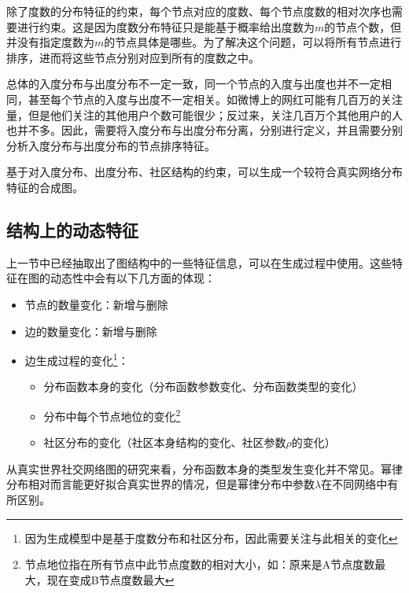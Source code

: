 除了度数的分布特征的约束，每个节点对应的度数、每个节点度数的相对次序也需要进行约束。这是因为度数分布特征只是能基于概率给出度数为$m$的节点个数，但并没有指定度数为$m$的节点具体是哪些。为了解决这个问题，可以将所有节点进行排序，进而将这些节点分别对应到所有的度数之中。

总体的入度分布与出度分布不一定一致，同一个节点的入度与出度也并不一定相同，甚至每个节点的入度与出度不一定相关。如微博上的网红可能有几百万的关注量，但是他们关注的其他用户个数可能很少；反过来，关注几百万个其他用户的人也并不多。因此，需要将入度分布与出度分布分离，分别进行定义，并且需要分别分析入度分布与出度分布的节点排序特征。

基于对入度分布、出度分布、社区结构的约束，可以生成一个较符合真实网络分布特征的合成图。

\subsection{结构上的动态特征}

上一节中已经抽取出了图结构中的一些特征信息，可以在生成过程中使用。这些特征在图的动态性中会有以下几方面的体现：

\begin{itemize}
    \item 节点的数量变化：新增与删除
    \item 边的数量变化：新增与删除
    \item 边生成过程的变化\footnote{因为生成模型中是基于度数分布和社区分布，因此需要关注与此相关的变化}：
    \begin{itemize}
        \item 分布函数本身的变化（分布函数参数变化、分布函数类型的变化）
        \item 分布中每个节点地位的变化\footnote{节点地位指在所有节点中此节点度数的相对大小，如：原来是A节点度数最大，现在变成B节点度数最大}
        \item 社区分布的变化（社区本身结构的变化、社区参数$\rho$的变化）
    \end{itemize}
\end{itemize}

\vspace{0.2cm}

从真实世界社交网络图的研究来看，分布函数本身的类型发生变化并不常见。幂律分布相对而言能更好拟合真实世界的情况，但是幂律分布中参数$\lambda$在不同网络中有所区别。

